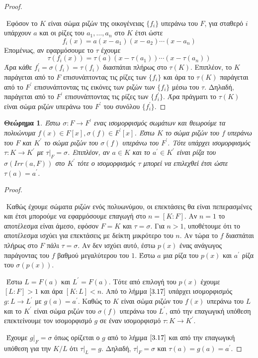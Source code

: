 \documentclass[oneside,a4paper]{article}
\newtheorem{theorem}{Θεώρημα}
\begin{document}
\begin{proof} $ $
	
	$ $\newline
	Εφόσον το $K$ είναι σώμα ριζών της οικογένειας $\{f_i\}$ υπεράνω του $F$, για σταθερό $i$ υπάρχουν $a$ και οι ρίζες του $a_1,\ldots, a_n$ στο $K$ έτσι ώστε
	$$f_i(x) = a(x-a_1)(x-a_2)\cdots (x-a_n)$$
	Επομένως, αν εφαρμόσουμε το $\tau$ έχουμε
	$$\tau(f_i (x)) = \tau(a) (x-\tau(a_1))\cdots (x-\tau(a_n))$$
	Άρα κάθε $f^{\prime}_i = \sigma( f_i) = \tau(f_i)$ διασπάται πλήρως στο $\tau (K)$. Επιπλέον, το $K$ παράγεται από το $F$ επισυνάπτοντας τις ρίζες των $\{f_i\}$ και άρα το $\tau (K)$ παράγεται από το $F^{\prime}$ επισυνάπτοντας τις εικόνες των ριζών των $\{f_i\}$ μέσω του $\tau$. Δηλαδή, παράγεται από το $F^{\prime}$ επισυνάπτοντας τις ρίζες των $\{f^{\prime}_i \}$. Άρα πράγματι το $\tau (K)$ είναι σώμα ριζών υπεράνω του $F^{\prime}$ του συνόλου $\{f^{\prime}_i\}$.
\end{proof}
\vspace{0.1cm}
\begin{theorem} %
	Έστω $\sigma : F \rightarrow F^{\prime}$ ενας ισομορφισμός σωμάτων και θεωρούμε τα πολυώνυμα $f(x) \in F[x] , \sigma(f) \in F^{\prime}[x]$. Έστω $K$ το σώμα ριζών του $f$ υπεράνω του $F$ και $K^{\prime}$ το σώμα ριζών του $\sigma (f)$ υπεράνω του $F^{\prime}$. Τότε υπάρχει ισομορφισμός $\tau: K \rightarrow K^{\prime}$ με $\tau|_F = \sigma$. Επιπλέον, αν $a \in K$ και το $a^{\prime} \in K^{\prime}$ είναι ρίζα του $\sigma (Irr(a,F))$ στο $K^{\prime}$ τότε ο ισομορφισμός $\tau$ μπορεί να επιλεχθεί έτσι ώστε $\tau(a) = a^{\prime}$. 
\end{theorem}

\begin{proof} $ $
	
	$ $\newline 
	Καθώς έχουμε σώματα ριζών ενός πολυωνύμου, οι επεκτάσεις θα είναι πεπερασμένες και έτσι μπορούμε να εφαρμόσουμε επαγωγή στο $n = [K:F]$. Αν $n=1$ το αποτέλεσμα είναι άμεσο, εφόσον $F=K$ και $\tau = \sigma$. Για $n>1$, υποθέτουμε ότι το αποτέλεσμα ισχύει για επεκτάσεις με δείκτη μικρότερο του $n$. Αν τώρα το $f$ διασπάται πλήρως στο $F$ πάλι $\tau = \sigma$. Αν δεν ισχύει αυτό, έστω $p(x)$ ένας ανάγωγος παράγοντας του $f$ βαθμού μεγαλύτερου του $1$. Έστω $a$ μια ρίζα του $p(x)$ και $a^{\prime}$ ρίζα του $\sigma ( p(x))$.

	$ $\newline
	Έστω $L=F(a)$ και $L^{\prime} = F(a)$. Τότε από επιλογή του $p(x)$ έχουμε $[L:F] > 1$ και άρα $[K:L]<n$. Από το λήμμα $\ref{3.17}$ υπάρχει ισομορφισμός $g : L\rightarrow L^{\prime}$ με $g(a) = a^{\prime}$. Καθώς το $K$ είναι σώμα ριζών του $f(x)$ υπεράνω του $L$ και το $K^{\prime}$ είναι σώμα ριζών του $\sigma (f)$ υπεράνω του $L^{\prime}$, από την επαγωγική υπόθεση επεκτείνουμε τον ισομορφισμό $g$ σε έναν ισομορφισμό $\tau : K \rightarrow K^{\prime}$.

	$ $\newline
	Έχουμε $g|_F = \sigma$ όπως ορίζεται ο $g$ από το λήμμα $\ref{3.17}$ και από την επαγωγική υπόθεση για την $K/L$ ότι $\tau|_L = g$. Δηλαδή, $\tau|_F = \sigma$ και $\tau (a) = g(a) = a^{\prime}$.
\end{proof}
\end{document}
